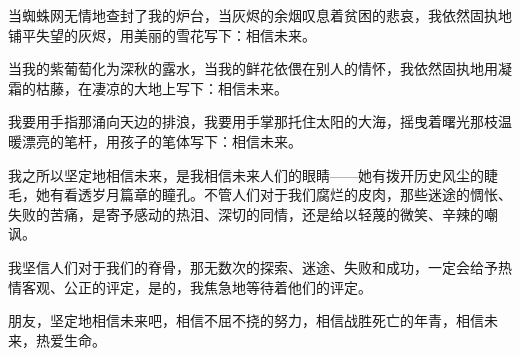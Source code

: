
\acknowledgement

当蜘蛛网无情地查封了我的炉台，当灰烬的余烟叹息着贫困的悲哀，我依然固执地铺平失望的灰烬，用美丽的雪花写下：相信未来。

当我的紫葡萄化为深秋的露水，当我的鲜花依偎在别人的情怀，我依然固执地用凝霜的枯藤，在凄凉的大地上写下：相信未来。

我要用手指那涌向天边的排浪，我要用手掌那托住太阳的大海，摇曳着曙光那枝温暖漂亮的笔杆，用孩子的笔体写下：相信未来。

我之所以坚定地相信未来，是我相信未来人们的眼睛——她有拨开历史风尘的睫毛，她有看透岁月篇章的瞳孔。不管人们对于我们腐烂的皮肉，那些迷途的惆怅、失败的苦痛，是寄予感动的热泪、深切的同情，还是给以轻蔑的微笑、辛辣的嘲讽。

我坚信人们对于我们的脊骨，那无数次的探索、迷途、失败和成功，一定会给予热情客观、公正的评定，是的，我焦急地等待着他们的评定。

朋友，坚定地相信未来吧，相信不屈不挠的努力，相信战胜死亡的年青，相信未来，热爱生命。

